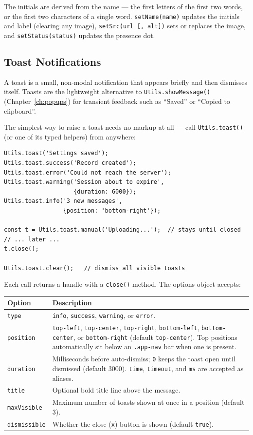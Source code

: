 \noindent
The initials are derived from the name --- the first letters of the first two words, or the first two characters of a single word.  \texttt{setName(name)} updates the initials and label (clearing any image), \texttt{setSrc(url [, alt])} sets or replaces the image, and \texttt{setStatus(status)} updates the presence dot.

\subsection{Toast Notifications}
\label{sec:comp-toast}

A toast is a small, non-modal notification that appears briefly and then dismisses itself.  Toasts are the lightweight alternative to \texttt{Utils.showMessage()} (Chapter~\ref{ch:popups}) for transient feedback such as ``Saved'' or ``Copied to clipboard''.

The simplest way to raise a toast needs no markup at all --- call \texttt{Utils.toast()} (or one of its typed helpers) from anywhere:

\begin{lstlisting}[style=javascript]
Utils.toast('Settings saved');
Utils.toast.success('Record created');
Utils.toast.error('Could not reach the server');
Utils.toast.warning('Session about to expire',
                    {duration: 6000});
Utils.toast.info('3 new messages',
                 {position: 'bottom-right'});

const t = Utils.toast.manual('Uploading...');  // stays until closed
// ... later ...
t.close();

Utils.toast.clear();   // dismiss all visible toasts
\end{lstlisting}

\noindent
Each call returns a handle with a \texttt{close()} method.  The options object accepts:

\begin{longtable}{P{3.2cm}P{7.3cm}}
\toprule
\textbf{Option} & \textbf{Description} \\
\midrule
\endhead
\texttt{type} & \texttt{info}, \texttt{success}, \texttt{warning}, or \texttt{error}. \\
\texttt{position} & \texttt{top-left}, \texttt{top-center}, \texttt{top-right}, \texttt{bottom-left}, \texttt{bottom-center}, or \texttt{bottom-right} (default \texttt{top-center}).  Top positions automatically sit below an \texttt{.app-nav} bar when one is present. \\
\texttt{duration} & Milliseconds before auto-dismiss; \texttt{0} keeps the toast open until dismissed (default 3000).  \texttt{time}, \texttt{timeout}, and \texttt{ms} are accepted as aliases. \\
\texttt{title} & Optional bold title line above the message. \\
\texttt{maxVisible} & Maximum number of toasts shown at once in a position (default 3). \\
\texttt{dismissible} & Whether the close (\texttt{x}) button is shown (default \texttt{true}). \\
\bottomrule
\end{longtable}

